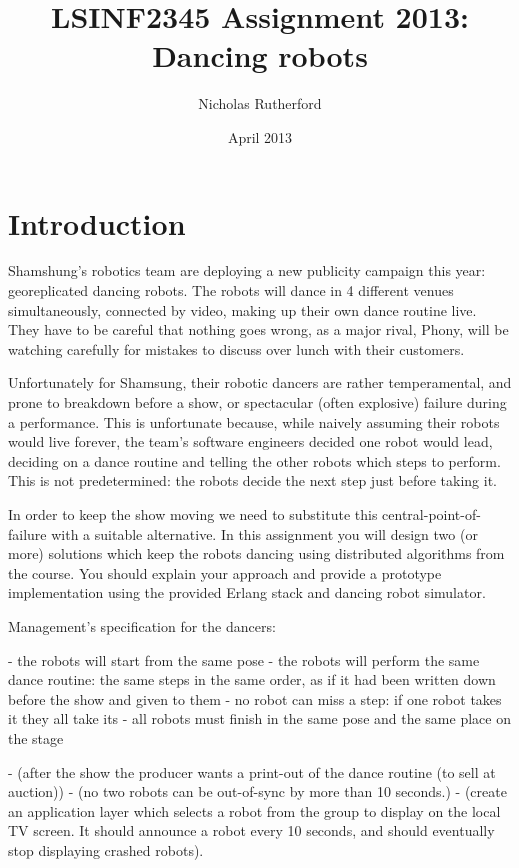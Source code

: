 \documentclass[a4paper]{article}
\title{LSINF2345 Assignment 2013: Dancing robots}
\author{Nicholas Rutherford}
\date{April 2013}
\begin{document}
\lstset{language=erlang}

\ifpdf
{}
\else
{}
\fi

\maketitle


\section{Introduction}

Shamshung's robotics team are deploying a new publicity campaign this year:
georeplicated dancing robots. The robots will dance in 4 different venues
simultaneously, connected by video, making up their own dance routine live.
They have to be careful that nothing goes wrong, as a major rival,
Phony, will be watching carefully for mistakes to discuss over lunch with
their customers.

Unfortunately for Shamsung, their robotic dancers are rather temperamental,
and prone to breakdown before a show, or spectacular (often explosive) failure
during a performance. This is unfortunate because, while naively assuming
their robots would live forever, the team's software engineers decided one
robot would lead, deciding on a dance routine and telling the other robots
which steps to perform. This is not predetermined: the robots decide the next
step just before taking it.

In order to keep the show moving we need to substitute this
central-point-of-failure with a suitable alternative. In this assignment you
will design two (or more) solutions which keep the robots dancing using
distributed algorithms from the course. You should explain your approach and
provide a prototype implementation using the provided Erlang stack and
dancing robot simulator.

Management's specification for the dancers:

  - the robots will start from the same pose
  - the robots will perform the same dance routine: the same steps in the same order,
    as if it had been written down before the show and given to them
  - no robot can miss a step: if one robot takes it they all take its
  - all robots must finish in the same pose and the same place on the stage

  - (after the show the producer wants a print-out of the dance routine (to sell at auction))
  - (no two robots can be out-of-sync by more than 10 seconds.)
  - (create an application layer which selects a robot from the group to 
      display on the local TV screen. It should announce a robot every 10 seconds, 
      and should eventually stop displaying crashed robots).
\end{document}

